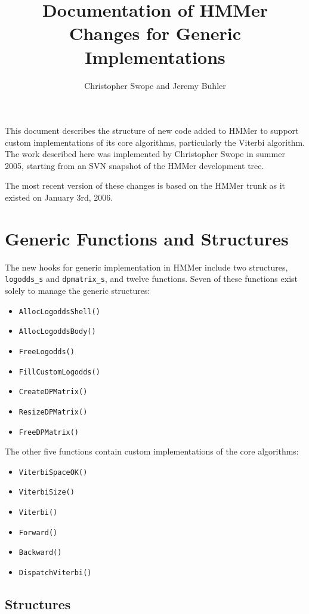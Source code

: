 \documentclass[letterpaper,10pt]{article}
\newcommand{\func}[1]{\texttt{#1()}}
\newcommand{\struct}[1]{\texttt{#1}}
\begin{document}
\title{Documentation of HMMer Changes for Generic Implementations}
\author{Christopher Swope and Jeremy Buhler}

\maketitle

This document describes the structure of new code added to HMMer to
support custom implementations of its core algorithms, particularly
the Viterbi algorithm.  The work described here was implemented by
Christopher Swope in summer 2005, starting from an SVN snapshot of the
HMMer development tree.

The most recent version of these changes is based on the HMMer trunk
as it existed on January 3rd, 2006.

\section*{Generic Functions and Structures}

The new hooks for generic implementation in HMMer include two
structures, \struct{logodds\_s} and \struct{dpmatrix\_s}, and twelve
functions.  Seven of these functions exist solely to manage
the generic structures:
\begin{itemize}
  \item \func{AllocLogoddsShell}
  \item \func{AllocLogoddsBody}
  \item \func{FreeLogodds}
  \item \func{FillCustomLogodds}
  \item \func{CreateDPMatrix}
  \item \func{ResizeDPMatrix}
  \item \func{FreeDPMatrix}
\end{itemize} 
The other five functions contain custom implementations of the core
algorithms:
\begin{itemize}
  \item \func{ViterbiSpaceOK}
  \item \func{ViterbiSize}
  \item \func{Viterbi}
  \item \func{Forward}
  \item \func{Backward}
  \item \func{DispatchViterbi}
\end{itemize}

\subsection*{Structures}
\end{document}
